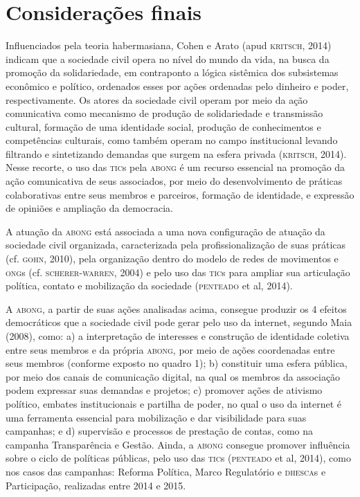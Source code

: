\section{Considerações finais}

Influenciados pela teoria habermasiana, Cohen e Arato (apud \textsc{kritsch},
2014) indicam que a sociedade civil opera no nível do mundo da vida, na
busca da promoção da solidariedade, em contraponto a lógica sistêmica
dos subsistemas econômico e político, ordenados esses por ações
ordenadas pelo dinheiro e poder, respectivamente. Os atores da sociedade
civil operam por meio da ação comunicativa como mecanismo de produção de
solidariedade e transmissão cultural, formação de uma identidade social,
produção de conhecimentos e competências culturais, como também operam
no campo institucional levando filtrando e sintetizando demandas que
surgem na esfera privada (\textsc{kritsch}, 2014). Nesse recorte, o uso das \textsc{tic}s
pela \textsc{abong} é um recurso essencial na promoção da ação comunicativa de
seus associados, por meio do desenvolvimento de práticas colaborativas
entre seus membros e parceiros, formação de identidade, e expressão de
opiniões e ampliação da democracia.

A atuação da \textsc{abong} está associada a uma nova configuração de atuação da
sociedade civil organizada, caracterizada pela profissionalização de
suas práticas (cf. \textsc{gohn}, 2010), pela organização dentro do modelo de
redes de movimentos e \textsc{ong}s (cf. \textsc{scherer}-\textsc{warren}, 2004) e pelo uso das
\textsc{tic}s para ampliar sua articulação política, contato e mobilização da
sociedade (\textsc{penteado} et al, 2014).

A \textsc{abong}, a partir de suas ações analisadas acima, consegue produzir os 4
efeitos democráticos que a sociedade civil pode gerar pelo uso da
internet, segundo Maia (2008), como: a) a interpretação de interesses e
construção de identidade coletiva entre seus membros e da própria \textsc{abong},
por meio de ações coordenadas entre seus membros (conforme exposto no
quadro 1); b) constituir uma esfera pública, por meio dos canais de
comunicação digital, na qual os membros da associação podem expressar
suas demandas e projetos; c) promover ações de ativismo político,
embates institucionais e partilha de poder, no qual o uso da internet é
uma ferramenta essencial para mobilização e dar visibilidade para suas
campanhas; e d) supervisão e processos de prestação de contas, como na
campanha Transparência e Gestão. Ainda, a \textsc{abong} consegue promover
influência sobre o ciclo de políticas públicas, pelo uso das \textsc{tic}s
(\textsc{penteado} et al, 2014), como nos casos das campanhas: Reforma Política,
Marco Regulatório e \textsc{dhesca}s e Participação, realizadas entre 2014 e
2015.

